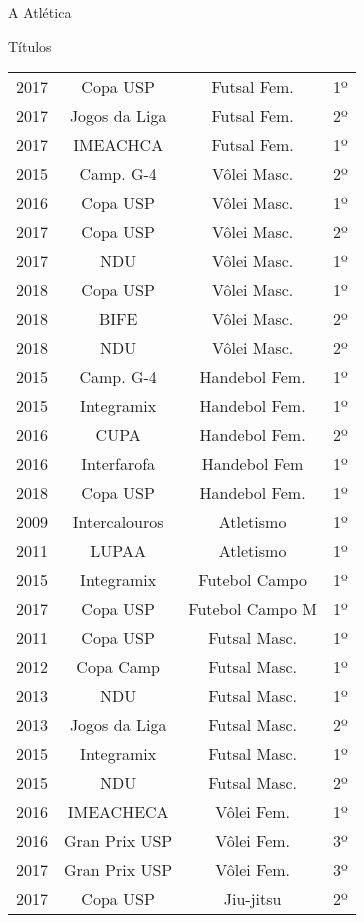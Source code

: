 \begin{secao}{A Atlética}
\begin{subsecao}{Títulos}
\begin{center}
\begin{tabular}{c|c|c|c}
    \hline
    2017 & Copa USP       & Futsal Fem.     & 1º\\
    2017 & Jogos da Liga  & Futsal Fem.     & 2º\\
    2017 & IMEACHCA       & Futsal Fem.     & 1º\\
    2015 & Camp. G-4      & Vôlei Masc.     & 2º\\
    2016 & Copa USP       & Vôlei Masc.     & 1º\\
    2017 & Copa USP       & Vôlei Masc.     & 2º\\
    2017 & NDU            & Vôlei Masc.     & 1º\\
    2018 & Copa USP       & Vôlei Masc.     & 1º\\
    2018 & BIFE           & Vôlei Masc.     & 2º\\
    2018 & NDU            & Vôlei Masc.    & 2º\\
    2015 & Camp. G-4      & Handebol Fem.   & 1º\\
    2015 & Integramix     & Handebol Fem.   & 1º\\
    2016 & CUPA           & Handebol Fem.   & 2º\\
    2016 & Interfarofa    & Handebol Fem    & 1º\\
    2018 & Copa USP       & Handebol Fem.   & 1º\\
    2009 & Intercalouros  & Atletismo       & 1º\\
    2011 & LUPAA          & Atletismo       & 1º\\
    2015 & Integramix     & Futebol Campo   & 1º\\
    2017 & Copa USP       & Futebol Campo M & 1º\\
    2011 & Copa USP       & Futsal Masc.    & 1º\\
    2012 & Copa Camp      & Futsal Masc.    & 1º\\
    2013 & NDU            & Futsal Masc.    & 1º\\
    2013 & Jogos da Liga  & Futsal Masc.    & 2º\\
    2015 & Integramix     & Futsal Masc.    & 1º\\
    2015 & NDU            & Futsal Masc.    & 2º\\
    2016 & IMEACHECA      & Vôlei Fem.      & 1º\\
    2016 & Gran Prix USP  & Vôlei Fem.      & 3º\\
    2017 & Gran Prix USP  & Vôlei Fem.      & 3º\\
    2017 & Copa USP       & Jiu-jitsu       & 2º\\

\end{tabular}
\end{center}
\end{subsecao}
\end{secao}
